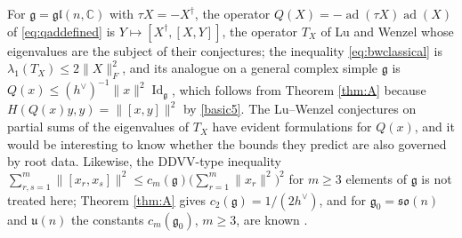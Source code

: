 \documentclass [leqno, 10pt]{amsart}
\theoremstyle{definition}
\numberwithin{equation}{section}
\newcommand{\so}{\mathfrak{so}}
\newcommand{\id}{\operatorname{Id}}
\newcommand{\gl}{\mathfrak{gl}}
\newcommand{\g}{\mathfrak{g}}
\newcommand{\ad}{\operatorname{ad}}
\newcommand{\com}{\mathbb C}
\newcommand{\gz}{\g_{0}}
\newcommand{\hv}{h^\vee}
\newcommand{\norm}[1]{\lVert #1\rVert}
\newcommand{\fnorm}[1]{\lVert #1\rVert_{F}}
\newcommand{\qad}{Q}
\begin{document}
\begin{remark}
For $\g = \gl(n, \com)$ with $\tau X = -X^{\dagger}$, the operator $\qad(X) = -\ad(\tau X)\ad(X)$ of \eqref{eq:qaddefined} is $Y \mapsto [X^{\dagger}, [X, Y]]$, the operator $T_{X}$ of Lu and Wenzel \cite{Ge-Li-Lu-Zhou, Lu-Wenzel} whose eigenvalues are the subject of their conjectures; the inequality \eqref{eq:bwclassical} is $\lambda_{1}(T_{X}) \leq 2\fnorm{X}^{2}$, and its analogue on a general complex simple $\g$ is $\qad(x) \leq (\hv)^{-1}\norm{x}^{2}\id_{\g}$, which follows from Theorem \ref{thm:A} because $H(\qad(x)y, y) = \norm{[x, y]}^{2}$ by \eqref{basic5}. The Lu--Wenzel conjectures on partial sums of the eigenvalues of $T_{X}$ have evident formulations for $\qad(x)$, and it would be interesting to know whether the bounds they predict are also governed by root data. Likewise, the DDVV-type inequality $\sum_{r, s = 1}^{m}\norm{[x_{r}, x_{s}]}^{2} \leq c_{m}(\g)\big(\sum_{r = 1}^{m}\norm{x_{r}}^{2}\big)^{2}$ for $m \geq 3$ elements of $\g$ is not treated here; Theorem \ref{thm:A} gives $c_{2}(\g) = 1/(2\hv)$, and for $\gz = \so(n)$ and $\mathfrak{u}(n)$ the constants $c_{m}(\gz)$, $m \geq 3$, are known \cite{Ge, Ge-Xu-You-Zhou}.
\end{remark}
\end{document}
